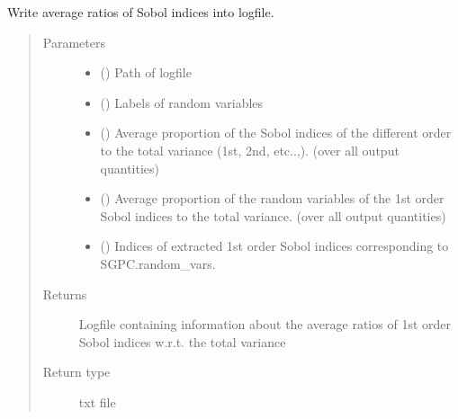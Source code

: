 \documentclass[letterpaper,10pt,english,openany,oneside]{sphinxmanual}
\begin{document}
\begin{fulllineitems}
\label{\detokenize{pygpc:pygpc.io.write_log_sobol}}
Write average ratios of Sobol indices into logfile.
\begin{quote}\begin{description}
\item[{Parameters}] \leavevmode\begin{itemize}
\item {} 
 () \textendash{} Path of logfile

\item {} 
 () \textendash{} Labels of random variables

\item {} 
 () \textendash{} Average proportion of the Sobol indices of the different order to the total variance (1st, 2nd, etc..,).
(over all output quantities)

\item {} 
 () \textendash{} Average proportion of the random variables of the 1st order Sobol indices to the total variance.
(over all output quantities)

\item {} 
 (\sphinxstyleliteralemphasis{\sphinxupquote{ {[}}}\sphinxstyleliteralemphasis{\sphinxupquote{{]}}}) \textendash{} Indices of extracted 1st order Sobol indices corresponding to SGPC.random\_vars.

\end{itemize}

\item[{Returns}] \leavevmode
{} \textendash{} Logfile containing information about the average ratios of 1st order Sobol indices w.r.t. the total variance

\item[{Return type}] \leavevmode
txt file

\end{description}\end{quote}

\end{fulllineitems}
\end{document}
